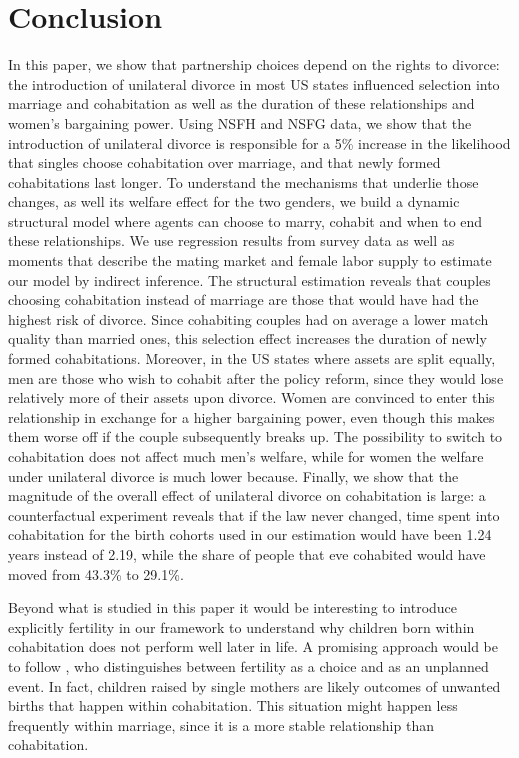 \documentclass[12pt]{article}
\numberwithin{table}{section}
\begin{document}
\section{Conclusion}
In this paper, we show that partnership choices depend on the rights to divorce: the introduction of unilateral divorce in most US states influenced selection into marriage and cohabitation as well as the duration of these relationships and women's bargaining power. Using NSFH and NSFG data, we show that the introduction of unilateral divorce is responsible for a 5\% increase in the likelihood that singles choose cohabitation over marriage, and that newly formed cohabitations last longer. To understand the mechanisms that underlie those changes, as well its welfare effect for the two genders, we build a dynamic structural model where agents can choose to marry, cohabit and when to end these relationships. We use regression results from survey data as well as moments that describe the mating market and female labor supply to estimate our model by indirect inference. The structural estimation reveals that couples choosing cohabitation instead of marriage are those that would have had the highest risk of divorce. Since cohabiting couples had on average a lower match quality than married ones, this selection effect increases the duration of newly formed cohabitations. Moreover, in the US states where assets are split equally, men are those who wish to cohabit after the policy reform, since they would lose relatively more of their assets upon divorce. Women are convinced to enter this relationship in exchange for a higher bargaining power, even though this makes them worse off if the couple subsequently breaks up. The possibility to switch to cohabitation does not affect much men's welfare, while for women the welfare under unilateral divorce is much lower because. Finally, we show that the magnitude of the overall effect of unilateral divorce on cohabitation is large: a counterfactual experiment reveals that if the law never changed, time spent into cohabitation for the birth cohorts used in our estimation would have been 1.24 years instead of 2.19, while the share of people that eve cohabited would have moved from 43.3\% to 29.1\%.

Beyond what is studied in this paper it would be interesting to introduce explicitly fertility in our framework to understand why children born within cohabitation does not perform well later in life. A promising approach would be to follow \cite{kozlov2020}, who distinguishes between fertility as a choice and as an unplanned event. In fact, children raised by single mothers are likely outcomes of unwanted births that happen within cohabitation. This situation might happen less frequently within marriage, since it is a more stable relationship than cohabitation.
\end{document}
